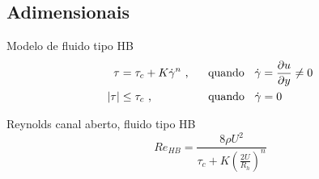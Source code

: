 \subsection{Adimensionais}

\begin{frame}

    \begin{exampleblock}{Modelo de fluido tipo HB}
        \begin{equation}
            \label{eq:HB_shear_stress}
            \begin{split}
                \tau &= \tau_c + K \dot{\gamma}^n
                \text{ ,\hspace{0.5 cm} quando \hspace{0.2cm}} \dot{\gamma} = \frac{\partial u}{\partial y} \ne 0
                \\
                |\tau| &\leq \tau_c
                \text{ ,\hspace{1.65cm} quando \hspace{0.2cm}} \dot{\gamma} = 0
            \end{split}
        \end{equation}
    \end{exampleblock}

    \begin{exampleblock}{Reynolds canal aberto, fluido tipo HB}
        \begin{equation}
            Re_{HB} = \frac{8 \rho U^2}{\tau_c + K \left( \frac{2U}{R_h} \right)^n}
        \end{equation}
    \end{exampleblock}

\end{frame}